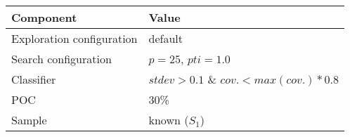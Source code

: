 \begin{tabular}{ll}
\hline
Component                    & Value         \\
\hline
Exploration configuration   & default          \\
Search configuration        & $p = 25$, $pti = 1.0$          \\
Classifier                  & $stdev > 0.1$ \& $cov. < max(cov.) * 0.8$          \\
POC                         & 30\%          \\
Sample                      & known ($S_1$) \\
\hline
\end{tabular}